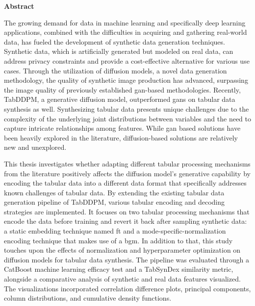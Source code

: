\thispagestyle{empty}
\begin{center}
	\textbf{\LARGE Abstract}
\end{center}
The growing demand for data in machine learning and specifically deep learning applications, combined with the difficulties in acquiring and gathering real-world data, has fueled the development of synthetic data generation techniques.
Synthetic data, which is artificially generated but modeled on real data, can address privacy constraints and provide a cost-effective alternative for various use cases.
Through the utilization of diffusion \glspl{model}, a novel data generation methodology, the quality of synthetic image production has advanced, surpassing the image quality of previously established \gls{gan}-based methodologies.
Recently, TabDDPM, a generative diffusion \gls{model}, outperformed \glspl{gan} on tabular data synthesis as well.
Synthesizing tabular data presents unique challenges due to the complexity of the underlying joint distributions between variables and the need to capture intricate relationships among features.
While \gls{gan} based solutions have been heavily explored in the literature, diffusion-based solutions are relatively new and unexplored.


This thesis investigates whether adapting different tabular processing mechanisms from the literature positively affects the diffusion \gls{model}'s generative capability by encoding the tabular data into a different data format that specifically addresses known challenges of tabular data.
By extending the existing tabular data generation pipeline of TabDDPM, various tabular encoding and decoding strategies are implemented.
It focuses on two tabular processing mechanisms that encode the data before training and revert it back after sampling synthetic data: a static embedding technique named \gls{ft} and a mode-specific-normalization encoding technique that makes use of a \gls{bgm}.
In addition to that, this study touches upon the effects of normalization and hyperparameter optimization on diffusion \glspl{model} for tabular data synthesis.
The pipeline was evaluated through a CatBoost machine learning efficacy test and a TabSynDex similarity metric, alongside a comparative analysis of synthetic and real data features visualized. 
The visualizations incorporated correlation difference plots, principal components, column distributions, and cumulative density functions.


